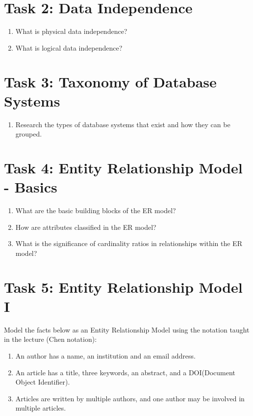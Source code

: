 \documentclass[10pt,a4paper]{article}
\begin{document}

\section*{Task 2: Data Independence}
\begin{enumerate}
\item What is physical data independence?

\item What is logical data independence?
\end{enumerate}


\section*{Task 3: Taxonomy of Database Systems}
\begin{enumerate}
\item Research the types of database systems that exist and how they can be grouped.
\end{enumerate}



\section*{Task 4: Entity Relationship Model - Basics}
\begin{enumerate}
\item What are the basic building blocks of the ER model?

\item How are attributes classified in the ER model?

\item What is the significance of cardinality ratios in relationships within the ER model?
\end{enumerate}



\section*{Task 5: Entity Relationship Model I}
Model the facts below as an Entity Relationship Model using the notation taught in the lecture (Chen notation):

\begin{enumerate}
\item An author has a name, an institution and an email address.

\item An article has a title, three keywords, an abstract, and a DOI(Document Object Identifier).

\item Articles are written by multiple authors, and one author may be involved in multiple articles.
\end{enumerate}
\end{document}
